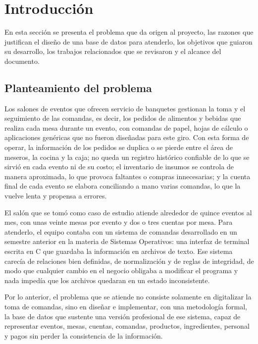 \newpage

\section{Introducción}
\label{sec:introduccion}

En esta sección se presenta el problema que da origen al proyecto, las razones que justifican el diseño de una base de datos para atenderlo, los objetivos que guiaron su desarrollo, los trabajos relacionados que se revisaron y el alcance del documento.

\subsection{Planteamiento del problema}

Los salones de eventos que ofrecen servicio de banquetes gestionan la toma y el seguimiento de las comandas, es decir, los pedidos de alimentos y bebidas que realiza cada mesa durante un evento, con comandas de papel, hojas de cálculo o aplicaciones genéricas que no fueron diseñadas para este giro. Con esta forma de operar, la información de los pedidos se duplica o se pierde entre el área de meseros, la cocina y la caja; no queda un registro histórico confiable de lo que se sirvió en cada evento ni de su costo; el inventario de insumos se controla de manera aproximada, lo que provoca faltantes o compras innecesarias; y la cuenta final de cada evento se elabora conciliando a mano varias comandas, lo que la vuelve lenta y propensa a errores.

El salón que se tomó como caso de estudio atiende alrededor de quince eventos al mes, con unas veinte mesas por evento y dos o tres cuentas por mesa. Para atenderlo, el equipo contaba con un sistema de comandas desarrollado en un semestre anterior en la materia de Sistemas Operativos: una interfaz de terminal escrita en C que guardaba la información en archivos de texto. Ese sistema carecía de relaciones bien definidas, de normalización y de reglas de integridad, de modo que cualquier cambio en el negocio obligaba a modificar el programa y nada impedía que los archivos quedaran en un estado inconsistente.

Por lo anterior, el problema que se atiende no consiste solamente en digitalizar la toma de comandas, sino en diseñar e implementar, con una metodología formal, la base de datos que sustente una versión profesional de ese sistema, capaz de representar eventos, mesas, cuentas, comandas, productos, ingredientes, personal y pagos sin perder la consistencia de la información.


